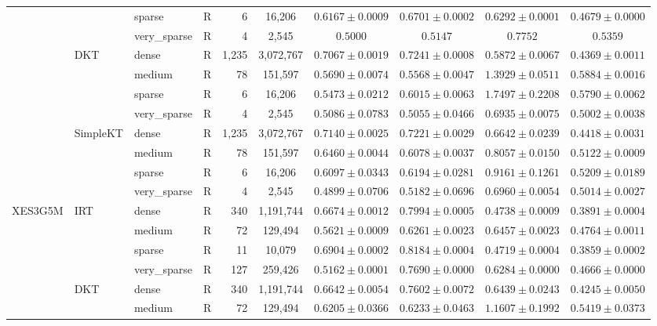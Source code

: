 \begin{table}[tbp]
{\begin{tabular}{lllcrccccc}
 &  & sparse & R & 6 & 16,206 & $0.6167 \pm 0.0009$ & $0.6701 \pm 0.0002$ & $0.6292 \pm 0.0001$ & $0.4679 \pm 0.0000$ \\
 &  & very\_sparse & R & 4 & 2,545 & $0.5000$ & $0.5147$ & $0.7752$ & $0.5359$ \\
 & DKT & dense & R & 1,235 & 3,072,767 & $0.7067 \pm 0.0019$ & $0.7241 \pm 0.0008$ & $0.5872 \pm 0.0067$ & $0.4369 \pm 0.0011$ \\
 &  & medium & R & 78 & 151,597 & $0.5690 \pm 0.0074$ & $0.5568 \pm 0.0047$ & $1.3929 \pm 0.0511$ & $0.5884 \pm 0.0016$ \\
 &  & sparse & R & 6 & 16,206 & $0.5473 \pm 0.0212$ & $0.6015 \pm 0.0063$ & $1.7497 \pm 0.2208$ & $0.5790 \pm 0.0062$ \\
 &  & very\_sparse & R & 4 & 2,545 & $0.5086 \pm 0.0783$ & $0.5055 \pm 0.0466$ & $0.6935 \pm 0.0075$ & $0.5002 \pm 0.0038$ \\
 & SimpleKT & dense & R & 1,235 & 3,072,767 & $0.7140 \pm 0.0025$ & $0.7221 \pm 0.0029$ & $0.6642 \pm 0.0239$ & $0.4418 \pm 0.0031$ \\
 &  & medium & R & 78 & 151,597 & $0.6460 \pm 0.0044$ & $0.6078 \pm 0.0037$ & $0.8057 \pm 0.0150$ & $0.5122 \pm 0.0009$ \\
 &  & sparse & R & 6 & 16,206 & $0.6097 \pm 0.0343$ & $0.6194 \pm 0.0281$ & $0.9161 \pm 0.1261$ & $0.5209 \pm 0.0189$ \\
 &  & very\_sparse & R & 4 & 2,545 & $0.4899 \pm 0.0706$ & $0.5182 \pm 0.0696$ & $0.6960 \pm 0.0054$ & $0.5014 \pm 0.0027$ \\
\midrule
XES3G5M & IRT & dense & R & 340 & 1,191,744 & $0.6674 \pm 0.0012$ & $0.7994 \pm 0.0005$ & $0.4738 \pm 0.0009$ & $0.3891 \pm 0.0004$ \\
 &  & medium & R & 72 & 129,494 & $0.5621 \pm 0.0009$ & $0.6261 \pm 0.0023$ & $0.6457 \pm 0.0023$ & $0.4764 \pm 0.0011$ \\
 &  & sparse & R & 11 & 10,079 & $0.6904 \pm 0.0002$ & $0.8184 \pm 0.0004$ & $0.4719 \pm 0.0004$ & $0.3859 \pm 0.0002$ \\
 &  & very\_sparse & R & 127 & 259,426 & $0.5162 \pm 0.0001$ & $0.7690 \pm 0.0000$ & $0.6284 \pm 0.0000$ & $0.4666 \pm 0.0000$ \\
 & DKT & dense & R & 340 & 1,191,744 & $0.6642 \pm 0.0054$ & $0.7602 \pm 0.0072$ & $0.6439 \pm 0.0243$ & $0.4245 \pm 0.0050$ \\
 &  & medium & R & 72 & 129,494 & $0.6205 \pm 0.0366$ & $0.6233 \pm 0.0463$ & $1.1607 \pm 0.1992$ & $0.5419 \pm 0.0373$ \\

\end{tabular}}
\end{table}
